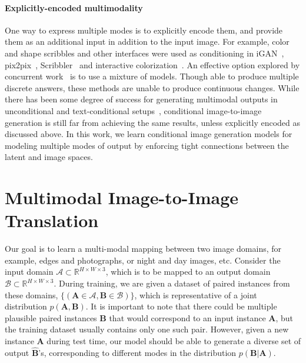 \documentclass{article}
\newcommand{\A}{\mathbf{A}\xspace}
\newcommand{\B}{\mathbf{B}\xspace}
\newcommand{\Bh}{\widehat{\mathbf{B}}\xspace}
\begin{document}
\paragraph{Explicitly-encoded multimodality}
One way to express multiple modes is to explicitly encode them, and provide them as an additional input in addition to the input image.
For example, color and shape scribbles and other interfaces were used as conditioning in iGAN~\citep{zhu2016generative}, pix2pix~\citep{isola2016image}, Scribbler~\citep{sangkloy2017scribbler} and interactive colorization~\citep{zhang2017real}. An effective option explored by concurrent work~\citep{ghosh2017multi, chen2017photographic,bansal2017pixelnn} is to use a mixture of models. Though able to produce multiple discrete answers, these methods are unable to produce continuous changes.
While there has been some degree of success for generating multimodal outputs in unconditional and text-conditional setups~\citep{goodfellow2014generative,nguyen2016plug,reed2016generative,dinh2016density,larsen2016vaegan}, conditional image-to-image generation is still far from achieving the same results, unless explicitly encoded as discussed above. 
In this work, we learn conditional image generation models for modeling multiple modes of output by enforcing tight connections between the latent and image spaces.
 
\section{Multimodal Image-to-Image Translation}
\label{sec:methods}
Our goal is to learn a multi-modal mapping between two image domains, for example, edges and photographs, or night and day images, etc. 
Consider the input domain $\mathcal{A}\!\subset\!\mathds{R}^{H\!\times W\!\times 3}$, which is to be mapped to an output domain $\mathcal{B}\!\subset\!\mathds{R}^{H\!\times W\!\times 3}$. 
During training, we are given a dataset of paired instances from these domains, $\big\{(\A\!\in\!\mathcal{A}, \B\!\in\!\mathcal{B})\big\}$, which is representative of a joint distribution $p(\A,\B)$.
It is important to note that there could be multiple plausible paired instances $\B$ that would correspond to an input instance $\A$, but the training dataset usually contains only one such pair.
However, given a new instance $\A$ during test time, our model should be able to generate a diverse set of output $\Bh$'s, corresponding to different modes in the distribution $p(\B|\A)$.
\end{document}
